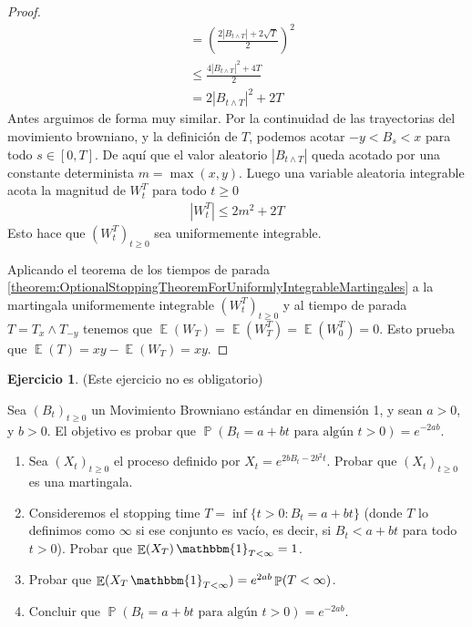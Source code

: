 \documentclass{article}
\DeclareMathOperator{\prob}{\mathbb{P}}
\DeclareMathOperator{\Expectation}{\mathbb{E}}
\DeclareMathOperator{\characteristic}{\mathbbm{1}}
\newcommand{\brownian}{B}
\newcommand{\wiener}{W}
\theoremstyle{definition}
\newtheorem{exercise}{Ejercicio}
\begin{document}
\begin{proof}
\begin{align}
	&=
	\left( \frac{2 \left| \brownian_{t \wedge T} \right| + 2 \sqrt{T}}{2} \right)^2
	\\
	&\leq
	\frac{4 \left| \brownian_{t \wedge T} \right|^2 + 4 T}{2}
	\\
	&=
	2 \left| \brownian_{t \wedge T} \right|^2 + 2 T
\end{align}
Antes arguimos de forma muy similar.
Por la continuidad de las trayectorias del movimiento browniano, y la definición de \(T\), podemos acotar \(- y < B_s < x\) para todo \(s \in [0, T]\).
De aquí que el valor aleatorio \(\left| B_{t \wedge T} \right|\) queda acotado por una constante determinista \(m = \max(x, y)\).
Luego una variable aleatoria integrable acota la magnitud de \(\wiener^T_t\) para todo \(t \geq 0\)
\begin{align}
	\left| \wiener^T_t \right|
	\leq
	2 m^2 + 2 T
\end{align}
Esto hace que \(\left( \wiener^T_t \right)_{t \geq 0}\) sea uniformemente integrable.

Aplicando el teorema de los tiempos de parada \ref{theorem:OptionalStoppingTheoremForUniformlyIntegrableMartingales} a la martingala uniformemente integrable \((\wiener^T_t)_{t \geq 0}\) y al tiempo de parada \(T = T_x \wedge T_{- y}\) tenemos que \(\Expectation(\wiener_T) = \Expectation \left( \wiener^T_T \right) = \Expectation \left( \wiener^T_0 \right) = 0\).
Esto prueba que \(\Expectation(T) = x y - \Expectation(\wiener_T) = x y\).
\end{proof}

\endgroup
\newpage
\begin{exercise}
(Este ejercicio no es obligatorio)

Sea \((B_t)_{t \geq 0}\) un Movimiento Browniano estándar en dimensión 1, y sean \(a > 0\), y \(b > 0\).
El objetivo es probar que \(\prob(B_t = a + b t \text{ para algún } t > 0) = e^{- 2 a b}\).
\begin{enumerate}[label=\alph*), ref=\theexercise.\alph*)]
	\item Sea \((X_t)_{t \geq 0}\) el proceso definido por \(X_t = e^{2 b B_t - 2 b^2 t}\).
	Probar que \((X_t)_{t \geq 0}\) es una martingala.
	\item Consideremos el stopping time \(T = \inf \{t > 0 : B_t = a + b t\}\) (donde \(T\) lo definimos como \(\infty\) si ese conjunto es vacío, es decir, si \(B_t < a + b t\) para todo \(t > 0\)).
	Probar que \(\Expectation(X_T) \characteristic_{T < \infty} = 1\).
	\item Probar que \(\Expectation(X_T \characteristic_{T < \infty}) = e^{2 a b} \prob(T < \infty)\).
	\item Concluir que \(\prob(B_t = a + b t\text{ para algún } t > 0) = e^{- 2 a b}\).
\end{enumerate}
\end{exercise}
\end{document}
